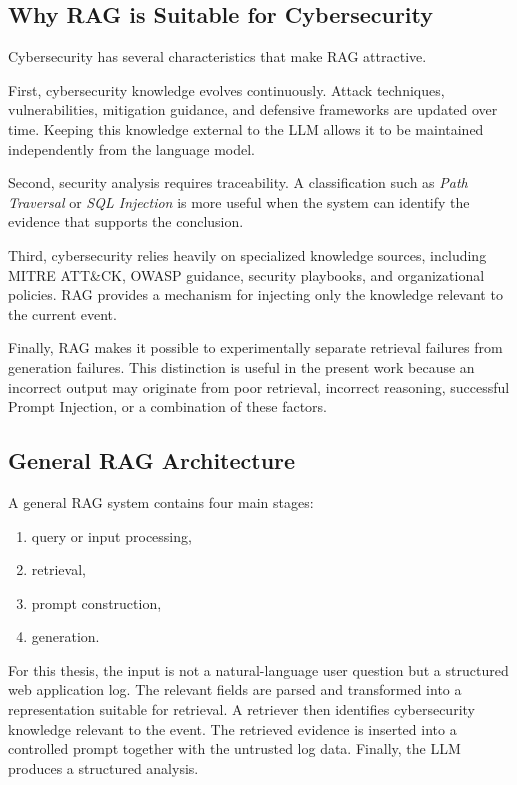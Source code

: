 \subsection{Why RAG is Suitable for
Cybersecurity}\label{why-rag-is-suitable-for-cybersecurity}

Cybersecurity has several characteristics that make RAG attractive.

First, cybersecurity knowledge evolves continuously. Attack techniques,
vulnerabilities, mitigation guidance, and defensive frameworks are
updated over time. Keeping this knowledge external to the LLM allows it
to be maintained independently from the language model.

Second, security analysis requires traceability. A classification such
as \emph{Path Traversal} or \emph{SQL Injection} is more useful when the
system can identify the evidence that supports the conclusion.

Third, cybersecurity relies heavily on specialized knowledge sources,
including MITRE ATT\&CK, OWASP guidance, security playbooks, and
organizational policies. RAG provides a mechanism for injecting only the
knowledge relevant to the current event.

Finally, RAG makes it possible to experimentally separate retrieval
failures from generation failures. This distinction is useful in the
present work because an incorrect output may originate from poor
retrieval, incorrect reasoning, successful Prompt Injection, or a
combination of these factors.

\subsection{General RAG Architecture}\label{general-rag-architecture}

A general RAG system contains four main stages:

\begin{enumerate}
\def\labelenumi{\arabic{enumi}.}
\tightlist
\item
  query or input processing,
\item
  retrieval,
\item
  prompt construction,
\item
  generation.
\end{enumerate}

For this thesis, the input is not a natural-language user question but a
structured web application log. The relevant fields are parsed and
transformed into a representation suitable for retrieval. A retriever
then identifies cybersecurity knowledge relevant to the event. The
retrieved evidence is inserted into a controlled prompt together with
the untrusted log data. Finally, the LLM produces a structured analysis.

